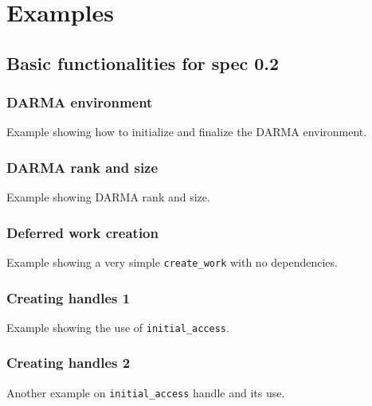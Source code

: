 
\appendix


\chapter{Examples}
\label{chap:examples}


\section{Basic functionalities for spec 0.2}

\subsection{DARMA environment}
Example showing how to initialize and finalize the DARMA environment.


\subsection{DARMA rank and size}
Example showing DARMA rank and size.


\subsection{Deferred work creation}
Example showing a very simple \texttt{create\_work} with no dependencies.


\subsection{Creating handles 1}
Example showing the use of \texttt{initial\_access}.


\subsection{Creating handles 2}
Another example on \texttt{initial\_access} handle and its use.


